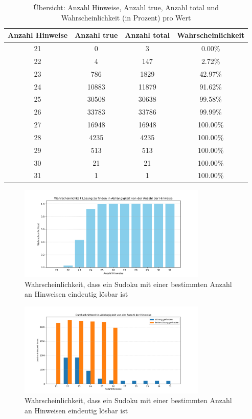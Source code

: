 \begin{table}[h!]
    \centering
    \begin{tabular}{|c|c|c|c|}
        \hline
        \textbf{Anzahl Hinweise} & \textbf{Anzahl true} & \textbf{Anzahl total} & \textbf{Wahrscheinlichkeit} \\
        \hline
        21 & 0     & 3     & 0.00\% \\
        22 & 4     & 147   & 2.72\% \\
        23 & 786   & 1829  & 42.97\% \\
        24 & 10883 & 11879 & 91.62\% \\
        25 & 30508 & 30638 & 99.58\% \\
        26 & 33783 & 33786 & 99.99\% \\
        27 & 16948 & 16948 & 100.00\% \\
        28 & 4235  & 4235  & 100.00\% \\
        29 & 513   & 513   & 100.00\% \\
        30 & 21    & 21    & 100.00\% \\
        31 & 1     & 1     & 100.00\% \\
        \hline
    \end{tabular}
    \caption{Übersicht: Anzahl Hinweise, Anzahl true, Anzahl total und Wahrscheinlichkeit (in Prozent) pro Wert}
\end{table}

\begin{figure}[h!]
    \centering
    \includegraphics[width=0.8\textwidth]{Pictures/wahrscheinlichkeiten}
    \caption{Wahrscheinlichkeit, dass ein Sudoku mit einer bestimmten Anzahl an Hinweisen eindeutig lösbar ist}
    \label{fig:wahrscheinlichkeiten}

\end{figure}

\begin{figure}[h!]
    \centering
    \includegraphics[width=0.8\textwidth]{Pictures/zeiten}
    \caption{Wahrscheinlichkeit, dass ein Sudoku mit einer bestimmten Anzahl an Hinweisen eindeutig lösbar ist}
    \label{fig:zeiten}
\end{figure}